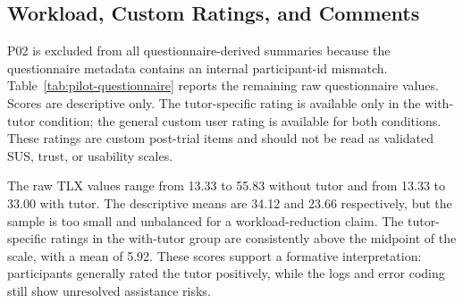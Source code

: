 \subsection{Workload, Custom Ratings, and Comments}

P02 is excluded from all questionnaire-derived summaries because the
questionnaire metadata contains an internal participant-id mismatch.
Table~\ref{tab:pilot-questionnaire} reports the remaining raw questionnaire
values.
Scores are descriptive only. The tutor-specific rating is available only in the
with-tutor condition; the general custom user rating is available for both
conditions. These ratings are custom post-trial items and should not be read as
validated SUS, trust, or usability scales.

\begin{table}[htbp]
\centering
\caption{Post-trial questionnaire summary after excluding P02. Confidence,
tutor rating, and user rating use the recorded 1--7 response scale; Raw TLX is
reported as an unweighted raw workload average.}
\label{tab:pilot-questionnaire}
\small
{}
\end{table}

The raw TLX values range from 13.33 to 55.83 without tutor and from 13.33 to
33.00 with tutor. The descriptive means are 34.12 and 23.66 respectively, but
the sample is too small and unbalanced for a workload-reduction claim. The
tutor-specific ratings in the with-tutor group are consistently above the
midpoint of the scale, with a mean of 5.92. These scores support a formative
interpretation: participants generally rated the tutor positively, while the
logs and error coding still show unresolved assistance risks.

